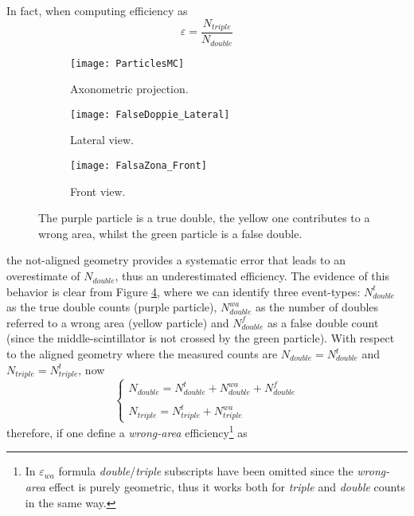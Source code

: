 In fact, when computing efficiency as
\begin{equation}
\varepsilon = \frac{N_{triple}}{N_{double}}
\end{equation}
\begin{figure}[!tbp]
	\centering
	\begin{subfigure}{.3\linewidth}
		\centering
		\texttt{[image: ParticlesMC]}
		\caption{Axonometric projection.} 
		\label{subfig:particles}
	\end{subfigure}\hfill
	\begin{subfigure}{.3\linewidth}
		\centering
		\texttt{[image: FalseDoppie\_Lateral]}
		\caption{Lateral view.} 
		\label{subfig:fd_lateral}
	\end{subfigure}\hfill
	\begin{subfigure}{.3\linewidth}
		\centering
		\texttt{[image: FalsaZona\_Front]}
		\caption{Front view.} 
		\label{subfig:fz_front}
	\end{subfigure}
	\caption{The purple particle is a true double, the yellow one contributes to a wrong area, whilst the green particle is a false double.} 
	\label{fig:uniformity_mc}
\end{figure}
the not-aligned geometry provides a systematic error that leads to an overestimate of $N_{double}$, thus an underestimated efficiency. The evidence of this behavior is clear from Figure \ref{fig:uniformity_mc}, where we can identify three event-types: $N_{double}^{t}$ as the true double counts (purple particle), $N_{double}^{wa}$ as the number of doubles referred to a wrong area (yellow particle) and $N_{double}^{f}$ as a false double count (since the middle-scintillator is not crossed by the green particle). With respect to the aligned geometry where the measured counts are $N_{double}=N_{double}^{t}$ and $N_{triple}=N_{triple}^{t}$, now
\begin{equation}\label{N_measured}
\left\{
\begin{array}{l}
N_{double}=N_{double}^{t}+N_{double}^{wa}+N_{double}^{f}\\\\
N_{triple}=N_{triple}^{t}+N_{triple}^{wa}
\end{array}
\right.
\end{equation}
therefore, if one define a \emph{wrong-area} efficiency\footnote{In $\varepsilon_{wa}$ formula \emph{double}/\emph{triple} subscripts have been omitted since the \emph{wrong-area} effect is purely geometric, thus it works both for \emph{triple} and \emph{double} counts in the same way.} as
